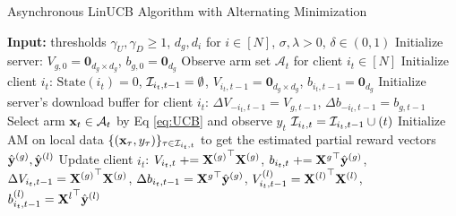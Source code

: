 \begin{algorithm}[h]
    \caption{Asynchronous LinUCB Algorithm with Alternating Minimization} \label{algo:AsyncLinUCB_AM_v2}
  \begin{algorithmic}[1]
    \STATE \textbf{Input:} thresholds $\gamma_{U}, \gamma_{D} \geq 1$, $d_{g},d_{i}$ for $i\in [N]$, $\sigma, \lambda > 0$, $\delta \in (0,1)$
    \STATE Initialize server: ${V}_{g, 0}=\textbf{0}_{d_{g} \times d_{g}}$, ${b}_{g,0}=\textbf{0}_{d_{g}}$
        \STATE Observe arm set $\mathcal{A}_{t}$ for client $i_{t} \in [N]$
            \STATE Initialize client $i_{t}$: $\text{State}(i_{t})=0$, $\mathcal{I}_{i_{t},t-1}=\emptyset$, ${V}_{i_{t}, t-1}=\textbf{0}_{d_{g} \times d_{g}}$, ${b}_{i_{t},t-1}=\textbf{0}_{d_{g}}$
            \STATE Initialize server's download buffer for client $i_{t}$: $\Delta{V}_{-i_{t}, t-1}=V_{g,t-1}$, $\Delta{b}_{-i_{t},t-1}=b_{g,t-1}$
        \ENDIF
            \STATE Select arm $\mathbf{x}_{t}\in\mathcal{A}_{t}$ by Eq \eqref{eq:UCB} and observe $y_{t}$
            \STATE $\mathcal{I}_{i_{t},t}=\mathcal{I}_{i_{t},t-1} \cup (t)$
                \STATE Initialize AM on local data $\{(\mathbf{x}_{\tau},y_{\tau})\}_{\tau \in \mathcal{I}_{i_{t},t}}$ to get the estimated partial reward vectors $\hat{\mathbf{y}}^{(g)},\hat{\mathbf{y}}^{(l)}$
                \STATE Update client $i_{t}$:
                ${V}_{i_{t}, t} \mathrel{+}= {\mathbf{X}^{(g)}}^{\top}\mathbf{X}^{(g)} $, ${b}_{i_{t},t} \mathrel{+}= {\mathbf{X}^{g}}^{\top} \hat{\mathbf{y}}^{(g)}$, $\Delta{V}_{i_{t}, t-1}={\mathbf{X}^{(g)}}^{\top}\mathbf{X}^{(g)}$, $\Delta{b}_{i_{t},t-1}={\mathbf{X}^{g}}^{\top} \hat{\mathbf{y}}^{(g)}$, ${V}^{(l)}_{i_{t},t-1}={\mathbf{X}^{(l)}}^{\top}\mathbf{X}^{(l)} $, ${b}^{(l)}_{i_{t},t-1}={\mathbf{X}^{l}}^{\top} \hat{\mathbf{y}}^{(l)}$

\end{algorithmic}
\end{algorithm}
